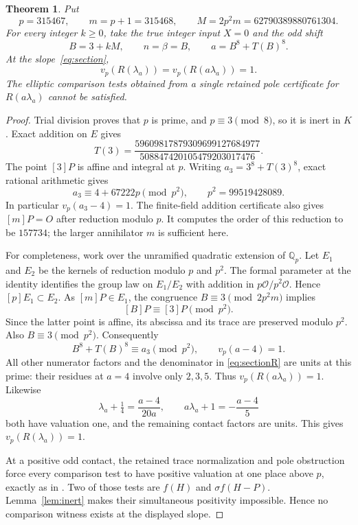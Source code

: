 \documentclass[11pt,a4paper]{article}
\newtheorem{theorem}{Theorem}[section]
\newcommand{\Q}{\mathbb Q}\newcommand{\Z}{\mathbb Z}
\begin{document}
\begin{theorem}\label{thm:sectionfailure}
Put
\[
        p=315467,\qquad m=p+1=315468,\qquad
        M=2p^2m=62790389880761304.
\]
For every integer $k\ge0$, take the true integer input $X=0$
and the odd shift
\[
                  B=3+kM,\qquad n=\beta=B,
 \qquad a=B^8+T(B)^8.
\]
At the slope~\eqref{eq:section},
\[
                v_p(R(\lambda_a))=v_p(R(a\lambda_a))=1.
\]
The elliptic comparison tests obtained from a single retained
pole certificate for $R(a\lambda_a)$ cannot be satisfied.
\end{theorem}
\begin{proof}
Trial division proves that $p$ is prime, and $p\equiv3\pmod8$,
so it is inert in $K$. Exact addition on $E$ gives
\begin{equation}\label{eq:T3}
 T(3)=\frac{59609817879309699127684977}{508847420105479203017476}.
\end{equation}
The point $[3]P$ is affine and integral at $p$.
Writing $a_3=3^8+T(3)^8$, exact rational arithmetic gives
\begin{equation}\label{eq:modp2}
              a_3\equiv4+67222p\pmod{p^2},
              \qquad p^2=99519428089.
\end{equation}
In particular $v_p(a_3-4)=1$.
The finite-field addition certificate also gives
$[m]P=O$ after reduction modulo $p$. It computes the order
of this reduction to be $157734$; the larger annihilator $m$
is sufficient here.

For completeness, work over the unramified quadratic extension
of $\Q_p$. Let $E_1$ and $E_2$ be the kernels of reduction
modulo $p$ and $p^2$. The formal parameter at the identity
identifies the group law on $E_1/E_2$ with addition in
$p\mathcal O/p^2\mathcal O$. Hence $[p]E_1\subset E_2$.
As $[m]P\in E_1$, the congruence $B\equiv3\pmod{2p^2m}$
implies
\[
                       [B]P\equiv[3]P\pmod{p^2}.
\]
Since the latter point is affine, its abscissa and its trace
are preserved modulo $p^2$. Also $B\equiv3\pmod{p^2}$.
Consequently
\[
                 B^8+T(B)^8\equiv a_3\pmod{p^2},
                 \qquad v_p(a-4)=1.
\]
All other numerator factors and the denominator in
\eqref{eq:sectionR} are units at this prime: their residues
at $a=4$ involve only $2,3,5$. Thus $v_p(R(a\lambda_a))=1$.
Likewise
\[
 \lambda_a+\tfrac14=\frac{a-4}{20a},\qquad
 a\lambda_a+1=-\frac{a-4}{5}
\]
both have valuation one, and the remaining contact factors are
units. This gives $v_p(R(\lambda_a))=1$.

At a positive odd contact, the retained trace normalization
and pole obstruction force every comparison test to have
positive valuation at one place above $p$, exactly as in
\cite[Lemma~4.1]{Conditional}. Two of those tests are
$f(H)$ and $\sigma f(H-P)$. Lemma~\ref{lem:inert} makes
their simultaneous positivity impossible. Hence no comparison
witness exists at the displayed slope.
\end{proof}
\end{document}
